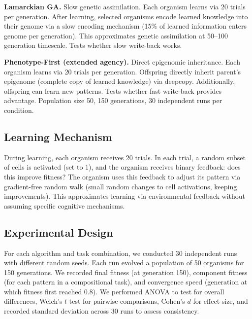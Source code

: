 \documentclass[twocolumn]{nature}
\begin{document}
\textbf{Lamarckian GA.} Slow genetic assimilation. Each organism learns via 20 trials per generation. After learning, selected organisms encode learned knowledge into their genome via a slow encoding mechanism (15\% of learned information enters genome per generation). This approximates genetic assimilation at 50--100 generation timescale. Tests whether slow write-back works.

\textbf{Phenotype-First (extended agency).} Direct epigenomic inheritance. Each organism learns via 20 trials per generation. Offspring directly inherit parent's epigenome (complete copy of learned knowledge) via deepcopy. Additionally, offspring can learn new patterns. Tests whether fast write-back provides advantage. Population size 50, 150 generations, 30 independent runs per condition.

\subsection*{Learning Mechanism}

During learning, each organism receives 20 trials. In each trial, a random subset of cells is activated (set to 1), and the organism receives binary feedback: does this improve fitness? The organism uses this feedback to adjust its pattern via gradient-free random walk (small random changes to cell activations, keeping improvements). This approximates learning via environmental feedback without assuming specific cognitive mechanisms.

\subsection*{Experimental Design}

For each algorithm and task combination, we conducted 30 independent runs with different random seeds. Each run evolved a population of 50 organisms for 150 generations. We recorded final fitness (at generation 150), component fitness (for each pattern in a compositional task), and convergence speed (generation at which fitness first reached 0.8). We performed ANOVA to test for overall differences, Welch's $t$-test for pairwise comparisons, Cohen's $d$ for effect size, and recorded standard deviation across 30 runs to assess consistency.

\end{document}
